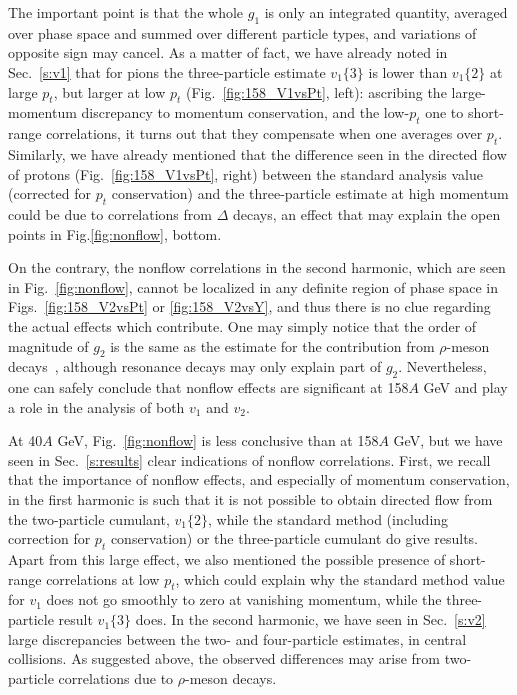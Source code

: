 \documentclass[aps,prc,superscriptaddress,showpacs,floatfix,nofootinbib]{revtex4}
\begin{document}
The important point is that the whole $g_1$ is
only an integrated quantity, averaged over phase space and summed over
different particle types, and variations of opposite sign may
cancel. As a matter of fact, we have already noted in Sec.~\ref{s:v1}
that for pions the three-particle estimate $v_1\{3\}$ is lower than
$v_1\{2\}$ at large $p_t$, but larger at low $p_t$
(Fig.~\ref{fig:158_V1vsPt}, left): ascribing the large-momentum
discrepancy to momentum conservation, and the low-$p_t$ one to
short-range correlations, it turns out that they compensate when one
averages over $p_t$. Similarly, we have already mentioned that the
difference seen in the directed flow of protons
(Fig.~\ref{fig:158_V1vsPt}, right) between the standard analysis value
(corrected for $p_t$ conservation) and the three-particle estimate at
high momentum could be due to correlations from $\Delta$ decays, an
effect that may explain the open points in Fig.\ref{fig:nonflow},
bottom.

On the contrary, the nonflow correlations in the second harmonic,
which are seen in Fig.~\ref{fig:nonflow}, cannot be localized in any
definite region of phase space in Figs.~\ref{fig:158_V2vsPt} or
\ref{fig:158_V2vsY}, and thus there is no clue regarding the actual
effects which contribute.  One may simply notice that the order of
magnitude of $g_2$ is the same as the estimate for the contribution
from $\rho$-meson decays~\cite{Borghini:2000cm}, although resonance
decays may only explain part of $g_2$.  Nevertheless, one can safely
conclude that nonflow effects are significant at 158$A$ GeV and
play a role in the analysis of both $v_1$ and $v_2$.

At 40$A$ GeV, Fig.~\ref{fig:nonflow} is less conclusive than at
158$A$ GeV, but we have seen in Sec.~\ref{s:results} clear
indications of nonflow correlations.  First, we recall that the
importance of nonflow effects, and especially of momentum conservation,
in the first harmonic is such that it is not possible to obtain
directed flow from the two-particle cumulant, $v_1\{2\}$, while the
standard method (including correction for $p_t$ conservation) or the
three-particle cumulant do give results. Apart from this large effect,
we also mentioned the possible presence of short-range correlations at
low $p_t$, which could explain why the standard method value for $v_1$
does not go smoothly to zero at vanishing momentum, while the
three-particle result $v_1\{3\}$ does.  In the second harmonic, we
have seen in Sec.~\ref{s:v2} large discrepancies between the two- and
four-particle estimates, in central collisions.  As suggested above,
the observed differences may arise from two-particle correlations due
to $\rho$-meson decays.
\end{document}

